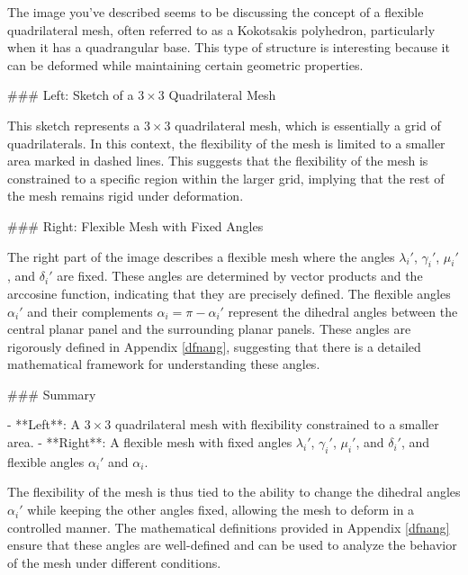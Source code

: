 The image you've described seems to be discussing the concept of a flexible quadrilateral mesh, often referred to as a Kokotsakis polyhedron, particularly when it has a quadrangular base. This type of structure is interesting because it can be deformed while maintaining certain geometric properties.

### Left: Sketch of a \(3 \times 3\) Quadrilateral Mesh

This sketch represents a \(3 \times 3\) quadrilateral mesh, which is essentially a grid of quadrilaterals. In this context, the flexibility of the mesh is limited to a smaller area marked in dashed lines. This suggests that the flexibility of the mesh is constrained to a specific region within the larger grid, implying that the rest of the mesh remains rigid under deformation.

### Right: Flexible Mesh with Fixed Angles

The right part of the image describes a flexible mesh where the angles \(\lambda_i'\), \(\gamma_i'\), \(\mu_i'\), and \(\delta_i'\) are fixed. These angles are determined by vector products and the arccosine function, indicating that they are precisely defined. The flexible angles \(\alpha_i'\) and their complements \(\alpha_i = \pi - \alpha_i'\) represent the dihedral angles between the central planar panel and the surrounding planar panels. These angles are rigorously defined in Appendix \ref{dfnang}, suggesting that there is a detailed mathematical framework for understanding these angles.

### Summary

- **Left**: A \(3 \times 3\) quadrilateral mesh with flexibility constrained to a smaller area.
- **Right**: A flexible mesh with fixed angles \(\lambda_i'\), \(\gamma_i'\), \(\mu_i'\), and \(\delta_i'\), and flexible angles \(\alpha_i'\) and \(\alpha_i\).

The flexibility of the mesh is thus tied to the ability to change the dihedral angles \(\alpha_i'\) while keeping the other angles fixed, allowing the mesh to deform in a controlled manner. The mathematical definitions provided in Appendix \ref{dfnang} ensure that these angles are well-defined and can be used to analyze the behavior of the mesh under different conditions.